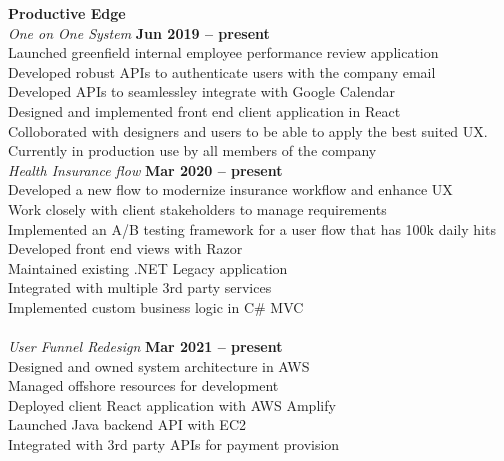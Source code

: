 \documentclass[margin,line]{resume}
\begin{document}
\begin{resume}
    \textbf{\listing Productive Edge} \vspace{2mm}\\\vspace{1mm}%
    \textsl{One on One System} \hfill \textbf{Jun 2019 -- present}\\
    Launched greenfield internal employee performance review application\\
    Developed  robust APIs to authenticate users with the company email\\
    Developed APIs to seamlessley integrate with Google Calendar\\
    Designed and implemented front end client application in React\\
    Colloborated with designers and users to be able to apply the best suited UX.\\
    Currently in production use by all members of the company
    \textbf{\listing} \vspace{2mm}\\\vspace{1mm}%
    \textsl{Health Insurance flow} \hfill \textbf{Mar 2020 -- present}\\
    Developed a new flow to modernize insurance workflow and enhance UX\\
    Work closely with client stakeholders to manage requirements\\
    Implemented an A/B testing framework for a user flow that has 100k daily hits\\
    Developed front end views with Razor\\
    Maintained existing .NET Legacy application\\
    Integrated with multiple 3rd party services\\ 
    Implemented custom business logic in C\# MVC\\
    \textbf{\listing} \vspace{2mm}\\\vspace{1mm}%
    \textsl{User Funnel Redesign} \hfill \textbf{Mar 2021 -- present}\\
    Designed and owned system architecture in AWS\\
    Managed offshore resources for development\\
    Deployed client React application with AWS Amplify\\
    Launched Java backend API with EC2\\
    Integrated with 3rd party APIs for payment provision\\ 

\end{resume}
\end{document}

